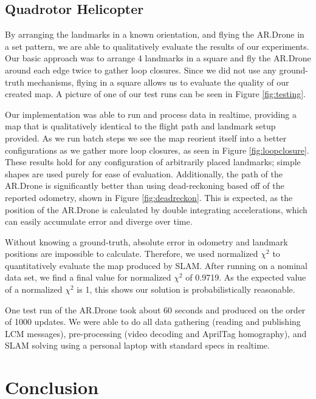 \documentclass[conference]{IEEEtran}
\begin{document}
\subsection{Quadrotor Helicopter}
\label{sub:results}

By arranging the landmarks in a known orientation, and flying the AR.Drone in a set
pattern, we are able to qualitatively evaluate the results of our experiments.  Our basic
approach was to arrange 4 landmarks in a square and fly the AR.Drone around each edge
twice to gather loop closures.  Since we did not use any ground-truth mechanisms, flying
in a square allows us to evaluate the quality of our created map. A picture of one of our
test runs can be seen in Figure \ref{fig:testing}.

Our implementation was able to run and process data in realtime, providing a map that is
qualitatively identical to the flight path and landmark setup provided.  As we run batch
steps we see the map reorient itself into a better configurations as we gather more loop
closures, as seen in Figure \ref{fig:loopclosure}. These results hold for any configuration 
of arbitrarily placed landmarks; simple shapes are used purely for ease of evaluation. Additionally, the path of
the AR.Drone is significantly better than using dead-reckoning based off of the reported
odometry, shown in Figure \ref{fig:deadreckon}.  This is expected, as the position of the AR.Drone is calculated by double
integrating accelerations, which can easily accumulate error and diverge over time.

Without knowing a ground-truth, absolute error in odometry and landmark positions are impossible to calculate.  Therefore, we used normalized $\chi^2$ to quantitatively evaluate the map produced by SLAM.  After running on a nominal data set, we find a final value for normalized $\chi^2$ of 0.9719.  As the expected value of a normalized $\chi^2$ is 1, this shows our solution is probabilistically reasonable. 

One test run of the AR.Drone took about 60 seconds and produced on the order of 1000
updates. We were able to do all data gathering (reading and publishing LCM messages),
pre-processing (video decoding and AprilTag homography), and SLAM solving using a personal
laptop with standard specs in realtime.


\section{Conclusion}
\label{sec:conclusion}
\end{document}
